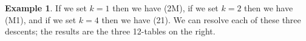 \documentclass[12pt]{article}
\theoremstyle{plain}
\theoremstyle{definition}
\newtheorem{example}[theorem]{Example}
\begin{document}
\begin{example}
If we set $k=1$ then we have (2M), if we set $k=2$ then we have (M1), and if we set $k=4$ then we have (21). We can resolve each of these three descents; the results are the three 12-tables on the right.


\begin{comment}
 

and resolving the descent $k=1$
in $P$
gives us the 12-table $\operatorname*{res}\nolimits_{1}P$, which is
\[
\ytableausetup{notabloids}
\begin{ytableau}
\none& \none& 1 & 2 & 1 \\
\none& 2 & 1 & 2 \\
1 & 2 & 1 \\
2 & 2 & 1 \\
2
\end{ytableau}%
\]

If we instead set $k=2$, then we have (M1), and resolving the descent
$k=2$ in $P$
gives us the 12-table $\operatorname*{res}\nolimits_{2}P$, which is
\[
\ytableausetup{notabloids}
\begin{ytableau}
\none& \none& 1 & 2 & 1 \\
\none& 1 & 1 & 2 \\
2 & 1 & 1 \\
2 & 1 & 2 \\
2
\end{ytableau}%
\]

If we instead set $k=4$, then we have (21), and resolving the descent
$k=4$ in $P$
gives us the 12-table $\operatorname*{res}\nolimits_{4}P$, which is
\[
\ytableausetup{notabloids}
\begin{ytableau}
\none& \none& 1 & 1 & 2 \\
\none& 1 & 1 & 1 \\
2 & 1 & 1 \\
2 & 2 & 1 \\
2
\end{ytableau}%
\]


\end{comment}
\end{example}
\end{document}
